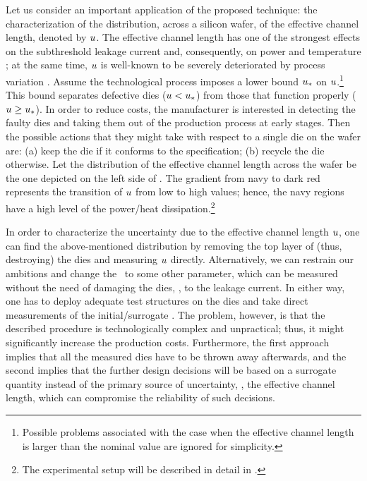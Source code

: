 
Let us consider an important application of the proposed technique: the characterization of the distribution, across a silicon wafer, of the effective channel length, denoted by $u$. The effective channel length has one of the strongest effects on the subthreshold leakage current and, consequently, on power and temperature \cite{juan2011, juan2012}; at the same time, $u$ is well-known to be severely deteriorated by process variation \cite{chandrakasan2001, srivastava2010}.
Assume the technological process imposes a lower bound $u_*$ on $u$.\footnote{Possible problems associated with the case when the effective channel length is larger than the nominal value are ignored for simplicity.} This bound separates defective dies ($u < u_*$) from those that function properly ($u \geq u_*$).
In order to reduce costs, the manufacturer is interested in detecting the faulty dies and taking them out of the production process at early stages.
Then the possible actions that they might take with respect to a single die on the wafer are: (a) keep the die if it conforms to the specification; (b) recycle the die otherwise.
Let the distribution of the effective channel length across the wafer be the one depicted on the left side of .
The gradient from navy to dark red represents the transition of $u$ from low to high values; hence, the navy regions have a high level of the power/heat dissipation.\footnote{The experimental setup will be described in detail in .}

In order to characterize the uncertainty due to the effective channel length $u$, one can find the above-mentioned distribution by removing the top layer of (thus, destroying) the dies and measuring $u$ directly.
Alternatively, we can restrain our ambitions and change the \qoi\ to some other parameter, which can be measured without the need of damaging the dies, \eg, to the leakage current.
In either way, one has to deploy adequate test structures on the dies and take direct measurements of the initial/surrogate \qoi. The problem, however, is that the described procedure is technologically complex and unpractical; thus, it might significantly increase the production costs.
Furthermore, the first approach implies that all the measured dies have to be thrown away afterwards, and the second implies that the further design decisions will be based on a surrogate quantity instead of the primary source of uncertainty, \ie, the effective channel length, which can compromise the reliability of such decisions.

